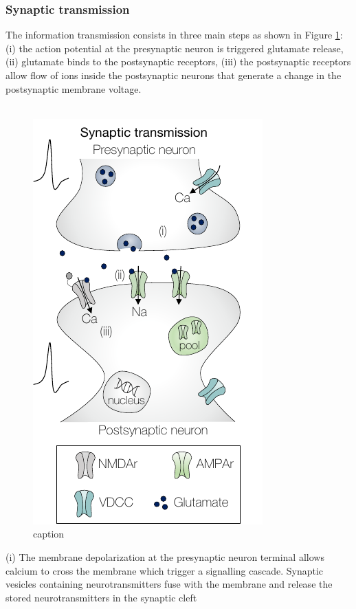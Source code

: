 \subsubsection{Synaptic transmission}
The information transmission consists in three main steps as shown in Figure \ref{fig:SP_SynTrans}: (i) the action potential at the presynaptic neuron is triggered  glutamate release, (ii) glutamate binds to the postsynaptic receptors, (iii) the postsynaptic receptors allow flow of ions inside the postsynaptic neurons that generate a change in the postsynaptic membrane voltage.\\
~\\
\begin{figure}
 \centering
    \includegraphics[scale=0.8]{latex/fig/Intro/SP_SynTrans.pdf}
    \caption{caption}
    \label{fig:SP_SynTrans}
\end{figure}
(i) The membrane depolarization at the presynaptic neuron terminal allows calcium to cross the membrane which trigger a signalling cascade. Synaptic vesicles containing neurotransmitters fuse with the membrane and release the stored neurotransmitters in the synaptic cleft 

